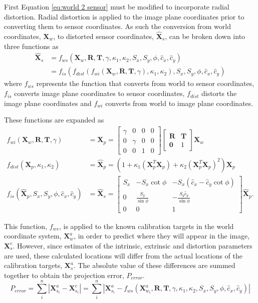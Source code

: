\documentclass[12pt,oneside,openany,a4paper, %
english, %
masters-t, goldenblock]{usthesis}
\begin{document}
First Equation \ref{eq:world 2 sensor} must be modified to incorporate radial distortion. Radial distortion is applied to the image plane coordinates prior to converting them to sensor coordinates. As such the conversion from world coordinates, $\bm{X}_w$, to distorted sensor coordinates, $\hat{\bm{X}}_s$, can be broken down into three functions as
\begin{align}
  \hat{\bm{X}}_s &= f_{ws}(\bm{X}_w,\bm{R},\bm{T},\gamma,\kappa_1,\kappa_2,S_x,S_y,\phi,\hat{c}_x,\hat{c}_y) \\
  &= f_{is}(f_{dist}(f_{wi}(\bm{X}_w,\bm{R},\bm{T},\gamma),\kappa_1,\kappa_2),S_x,S_y,\phi,\hat{c}_x,\hat{c}_y)
\end{align}
where $f_{ws}$ represents the function that converts from world to sensor coordinates, $f_{is}$ converts image plane coordinates to sensor coordinates, $f_{dist}$ distorts the image plane coordinates and $f_{wi}$ converts from world to image plane coordinates.

These functions are expanded as
\begin{align}
  f_{wi}(\bm{X}_w,\bm{R},\bm{T},\gamma) &= \bm{X}_p =
  \begin{bmatrix}
  \gamma & 0 & 0 & 0 \\
  0 & \gamma & 0 & 0 \\
  0 & 0 & 1 & 0
  \end{bmatrix}
  \begin{bmatrix}
  \bm{R} & \bm{T} \\
  \bm{0} & 1
  \end{bmatrix}
  \bm{X}_w \\
  f_{dist}(\bm{X}_p,\kappa_1,\kappa_2) &= \hat{\bm{X}}_p =
  \left( 1 + \kappa_1  (\bm{X}_p^T \bm{X}_p) + \kappa_2 (\bm{X}_p^T \bm{X}_p)^2 \right) \bm{X}_p \\
  f_{is}(\hat{\bm{X}}_p,S_x,S_y,\phi,\hat{c}_x,\hat{c}_y) &= \hat{\bm{X}}_s =
  \begin{bmatrix}
  S_x & -S_x \cot \phi & -S_x \left( \hat c_x - \hat c_y \cot \phi \right) \\
  0 & \frac{S_y}{\sin \phi} & -\frac{S_y \hat c_y}{\sin \phi} \\
  0 & 0 & 1
  \end{bmatrix}
  \hat{\bm{X}}_p.
\end{align}

This function, $f_{ws}$, is applied to the known calibration targets in the world coordinate system, $\bm{X}_w^a$, in order to predict where they will appear in the image, $\bm{X}_s^c$. However, since estimates of the intrinsic, extrinsic and distortion parameters are used, these calculated locations will differ from the actual locations of the calibration targets, $\bm{X}_s^a$. The absolute value of these differences are summed together to obtain the projection error, $P_{error}$.
\begin{equation}
  P_{error} = \sum_i^n \left| \bm{X}_{s_i}^a - \bm{X}_{s_i}^c \right| = \sum_i^n \left| \bm{X}_{s_i}^a - f_{ws}(\bm{X}_{w_i}^a,\bm{R},\bm{T},\gamma,\kappa_1,\kappa_2,S_x,S_y,\phi,\hat{c}_x,\hat{c}_y) \right|
\end{equation}
\end{document}
